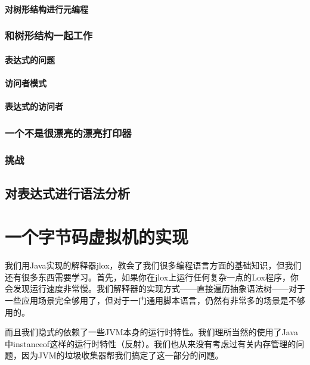 \documentclass[cn,10pt,math=newtx,citestyle=gb7714-2015,bibstyle=gb7714-2015]{elegantbook}
\begin{document}
\subsection{对树形结构进行元编程}

\section{和树形结构一起工作}

\subsection{表达式的问题}

\subsection{访问者模式}

\subsection{表达式的访问者}

\section{一个不是很漂亮的漂亮打印器}

\section{挑战}

\chapter{对表达式进行语法分析}

\part{一个字节码虚拟机的实现}

我们用Java实现的解释器jlox，教会了我们很多编程语言方面的基础知识，但我们还有很多东西需要学习。首先，如果你在jlox上运行任何复杂一点的Lox程序，你会发现运行速度非常慢。我们解释器的实现方式——直接遍历抽象语法树——对于一些应用场景完全够用了，但对于一门通用脚本语言，仍然有非常多的场景是不够用的。

而且我们隐式的依赖了一些JVM本身的运行时特性。我们理所当然的使用了Java中instanceof这样的运行时特性（反射）。我们也从来没有考虑过有关内存管理的问题，因为JVM的垃圾收集器帮我们搞定了这一部分的问题。
\end{document}
